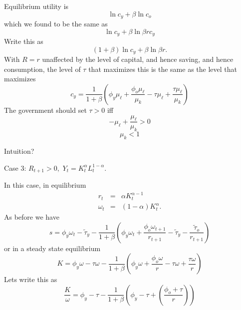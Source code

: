 \documentclass{sebase}
\begin{document}
Equilibrium utility is%
\begin{equation*}
\ln c_{y}+\beta \ln c_{o}
\end{equation*}%
which we found to be the same as%
\begin{equation*}
\ln c_{y}+\beta \ln \beta rc_{y}
\end{equation*}%
Write this as 
\begin{equation*}
\left( 1+\beta \right) \ln c_{y}+\beta \ln \beta r.
\end{equation*}%
With $R=r$ unaffected by the level of capital, and hence saving, and hence
consumption, the level of $\tau $ that maximizes this is the same as the
level that maximizes 
\begin{equation*}
c_{y}=\frac{1}{1+\beta }\left( \phi _{y}\mu _{\ell }+\frac{\phi _{o}\mu
_{\ell }}{\mu _{k}}-\tau \mu _{\ell }+\frac{\tau \mu _{\ell }}{\mu _{k}}%
\right)
\end{equation*}%
The government should set $\tau >0$ iff%
\begin{equation*}
-\mu _{\ell }+\frac{\mu _{\ell }}{\mu _{k}}>0
\end{equation*}%
\begin{equation*}
\mu _{k}<1
\end{equation*}

Intuition?

\pagebreak

Case 3: $R_{t+1}>0,$ $Y_{t}=K_{t}^{\alpha }L_{t}^{1-\alpha }$.

In this case, in equilibrium%
\begin{eqnarray*}
r_{t} &=&\alpha K_{t}^{\alpha -1} \\
\omega _{t} &=&\left( 1-\alpha \right) K_{t}^{\alpha }.
\end{eqnarray*}%
As before we have 
\begin{equation*}
s=\phi _{y}\omega _{t}-\tilde{\tau}_{y}-\frac{1}{1+\beta }\left( \phi
_{y}\omega _{t}+\frac{\phi _{o}\omega _{t+1}}{r_{t+1}}-\tilde{\tau}_{y}-%
\frac{\tilde{\tau}_{o}}{r_{t+1}}\right)
\end{equation*}%
or in a steady state equilibrium 
\begin{equation*}
K=\phi _{y}\omega -\tau \omega -\frac{1}{1+\beta }\left( \phi _{y}\omega +%
\frac{\phi _{o}\omega }{r}-\tau \omega +\frac{\tau \omega }{r}\right)
\end{equation*}%
Lets write this as 
\begin{equation*}
\frac{K}{\omega }=\phi _{y}-\tau -\frac{1}{1+\beta }\left( \phi _{y}-\tau
+\left( \frac{\phi _{o}+\tau }{r}\right) \right)
\end{equation*}%
\pagebreak
\end{document}
